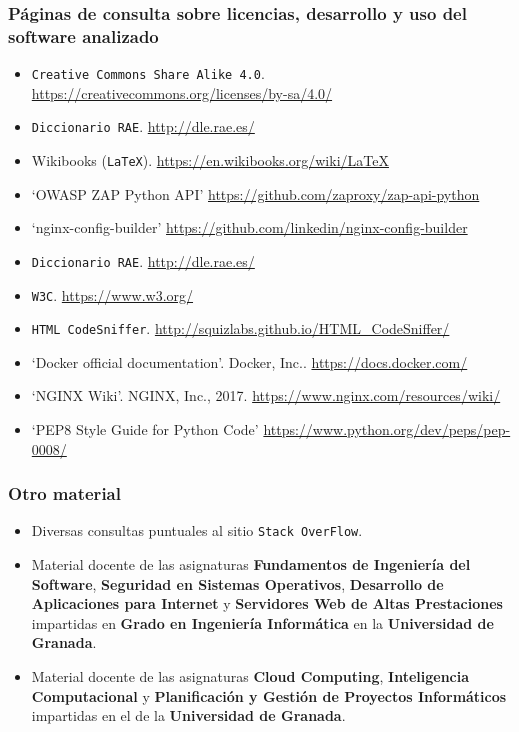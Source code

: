 
\printbibliography[heading=bibempty]

\bigskip
\subsubsection*{Páginas de consulta sobre licencias, desarrollo y uso del software analizado}
\begin{itemize}
	\item {\tt Creative Commons Share Alike 4.0}. \url{https://creativecommons.org/licenses/by-sa/4.0/}
	\item {\tt Diccionario RAE}. \url{http://dle.rae.es/}
	\item Wikibooks ({\tt LaTeX}). \url{https://en.wikibooks.org/wiki/LaTeX}
	\item `OWASP ZAP Python API' \url{https://github.com/zaproxy/zap-api-python}
	\item `nginx-config-builder' \url{https://github.com/linkedin/nginx-config-builder}
	\item {\tt Diccionario RAE}. \url{http://dle.rae.es/}
	\item {\tt W3C}. \url{https://www.w3.org/}
	\item {\tt HTML CodeSniffer}. \url{http://squizlabs.github.io/HTML_CodeSniffer/}
	\item `Docker official documentation'. Docker, Inc.. \url{https://docs.docker.com/}
	\item `NGINX Wiki'. NGINX, Inc., 2017. \url{https://www.nginx.com/resources/wiki/}
	\item `PEP8 Style Guide for Python Code' \url{https://www.python.org/dev/peps/pep-0008/}
\end{itemize}
\bigskip
\subsubsection*{Otro material}
\begin{itemize}
	\item Diversas consultas puntuales al sitio {\tt Stack OverFlow}.
	\item Material docente de las asignaturas \textbf{Fundamentos de Ingeniería del Software}, \textbf{Seguridad en Sistemas Operativos}, \textbf{Desarrollo de Aplicaciones para Internet} y \textbf{Servidores Web de Altas Prestaciones} impartidas en \textbf{Grado en Ingeniería Informática} en la \textbf{Universidad de Granada}.
	\item Material docente de las asignaturas \textbf{Cloud Computing}, \textbf{Inteligencia Computacional} y \textbf{Planificación y Gestión de Proyectos Informáticos} impartidas en el \master de la \textbf{Universidad de Granada}.
\end{itemize}